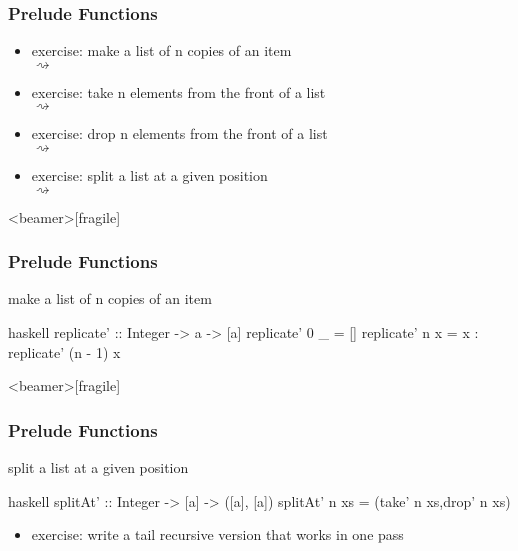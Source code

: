 \documentclass[dvipsnames]{beamer}
\theoremstyle{plain}
\begin{document}
\begin{frame}
  \frametitle{Prelude Functions}

  \begin{itemize}
    \item exercise: make a list of n copies of an item\\
       $\rightsquigarrow$
    \item exercise: take n elements from the front of a list\\
       $\rightsquigarrow$
    \item exercise: drop n elements from the front of a list\\
       $\rightsquigarrow$
    \item exercise: split a list at a given position\\
       $\rightsquigarrow$
  \end{itemize}
\end{frame}

\begin{frame}<beamer>[fragile]
  \frametitle{Prelude Functions}

  \begin{exampleblock}{make a list of n copies of an item}
    \begin{pygments}{haskell}
replicate' :: Integer -> a -> [a]
replicate' 0 _ = []
replicate' n x = x : replicate' (n - 1) x
    \end{pygments}
  \end{exampleblock}
\end{frame}

\begin{frame}<beamer>[fragile]
  \frametitle{Prelude Functions}

  \begin{exampleblock}{split a list at a given position}
    \begin{pygments}{haskell}
splitAt' :: Integer -> [a] -> ([a], [a])
splitAt' n xs = (take' n xs,drop' n xs)
    \end{pygments}
  \end{exampleblock}

  \pause
  \begin{itemize}
    \item exercise: write a tail recursive version that works in one pass
  \end{itemize}
\end{frame}
\end{document}
